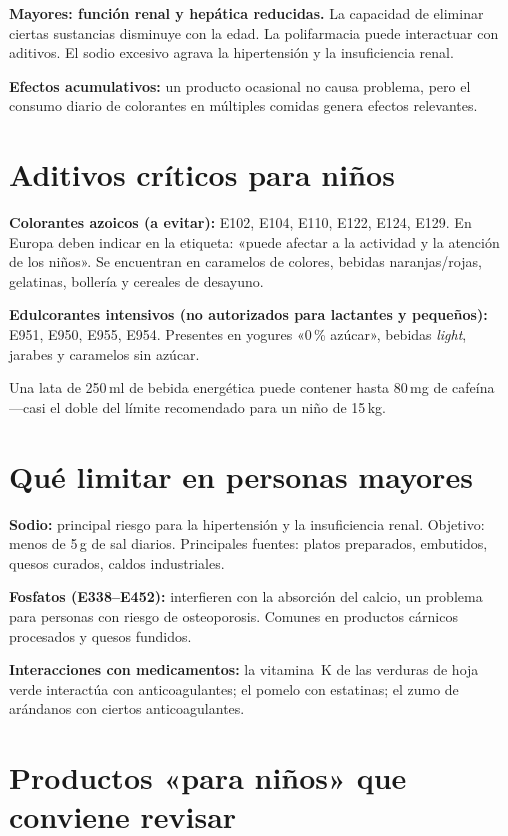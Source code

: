 \documentclass[a5paper,12pt,oneside,openany]{book}
\newcommand{\boxrojo}[2]{%
  \begin{tcolorbox}[cajabase,
    colback=rojo!8!white, colframe=rojo, title={#1}]
  #2\end{tcolorbox}}
\begin{document}
\textbf{Mayores: función renal y hepática reducidas.} La capacidad de
eliminar ciertas sustancias disminuye con la edad. La polifarmacia puede
interactuar con aditivos. El sodio excesivo agrava la hipertensión y la
insuficiencia renal.

\textbf{Efectos acumulativos:} un producto ocasional no causa problema, pero
el consumo diario de colorantes en múltiples comidas genera efectos relevantes.

\section{Aditivos críticos para niños}

\textbf{Colorantes azoicos (a evitar):}
E102, E104, E110, E122, E124, E129. En Europa deben indicar en la etiqueta:
«puede afectar a la actividad y la atención de los niños». Se encuentran en
caramelos de colores, bebidas naranjas/rojas, gelatinas, bollería y
cereales de desayuno.

\textbf{Edulcorantes intensivos (no autorizados para lactantes y pequeños):}
E951, E950, E955, E954. Presentes en yogures «0\,\% azúcar», bebidas
\textit{light}, jarabes y caramelos sin azúcar.

\boxrojo{Cafeína}{Una lata de 250\,ml de bebida energética puede contener
hasta 80\,mg de cafeína ---casi el doble del límite recomendado para un
niño de 15\,kg.}

\section{Qué limitar en personas mayores}

\textbf{Sodio:} principal riesgo para la hipertensión y la insuficiencia renal.
Objetivo: menos de 5\,g de sal diarios. Principales fuentes: platos preparados,
embutidos, quesos curados, caldos industriales.

\textbf{Fosfatos (E338--E452):} interfieren con la absorción del calcio,
un problema para personas con riesgo de osteoporosis. Comunes en productos
cárnicos procesados y quesos fundidos.

\textbf{Interacciones con medicamentos:} la vitamina~K de las verduras de
hoja verde interactúa con anticoagulantes; el pomelo con estatinas; el zumo
de arándanos con ciertos anticoagulantes.

\section{Productos «para niños» que conviene revisar}
\end{document}
